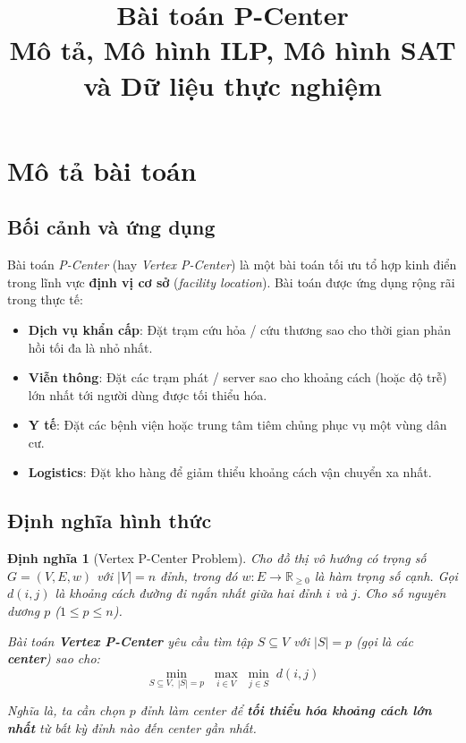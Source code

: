 \documentclass[11pt,a4paper]{article}
\title{\textbf{Bài toán P-Center}\\[6pt]
\large Mô tả, Mô hình ILP, Mô hình SAT và Dữ liệu thực nghiệm}
\author{}
\date{}
\newtheorem{definition}{Định nghĩa}
\begin{document}
\maketitle
\tableofcontents
\newpage

\section{Mô tả bài toán}
\label{sec:description}

\subsection{Bối cảnh và ứng dụng}

Bài toán \emph{P-Center} (hay \emph{Vertex P-Center}) là một bài toán tối ưu tổ hợp kinh điển trong lĩnh vực \textbf{định vị cơ sở} (\textit{facility location}).
Bài toán được ứng dụng rộng rãi trong thực tế:
\begin{itemize}[nosep]
    \item \textbf{Dịch vụ khẩn cấp}: Đặt trạm cứu hỏa / cứu thương sao cho thời gian phản hồi tối đa là nhỏ nhất.
    \item \textbf{Viễn thông}: Đặt các trạm phát / server sao cho khoảng cách (hoặc độ trễ) lớn nhất tới người dùng được tối thiểu hóa.
    \item \textbf{Y tế}: Đặt các bệnh viện hoặc trung tâm tiêm chủng phục vụ một vùng dân cư.
    \item \textbf{Logistics}: Đặt kho hàng để giảm thiểu khoảng cách vận chuyển xa nhất.
\end{itemize}

\subsection{Định nghĩa hình thức}

\begin{definition}[Vertex P-Center Problem]
Cho đồ thị vô hướng có trọng số $G = (V, E, w)$ với $|V| = n$ đỉnh, trong đó $w: E \to \mathbb{R}_{\ge 0}$ là hàm trọng số cạnh.
Gọi $d(i,j)$ là khoảng cách đường đi ngắn nhất giữa hai đỉnh $i$ và $j$.
Cho số nguyên dương $p$ ($1 \le p \le n$).

Bài toán \textbf{Vertex P-Center} yêu cầu tìm tập $S \subseteq V$ với $|S| = p$ (gọi là các \textbf{center}) sao cho:
\[
    \min_{S \subseteq V,\; |S|=p}\; \max_{i \in V}\; \min_{j \in S}\; d(i,j)
\]

Nghĩa là, ta cần chọn $p$ đỉnh làm center để \textbf{tối thiểu hóa khoảng cách lớn nhất} từ bất kỳ đỉnh nào đến center gần nhất.
\end{definition}
\end{document}
